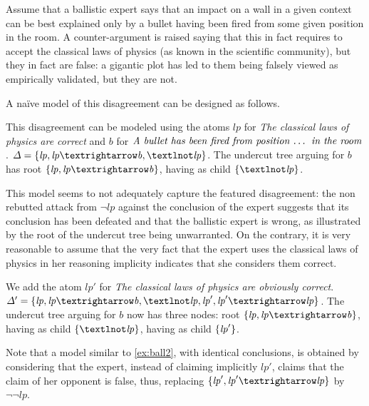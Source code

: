 \documentclass[version=3.21, pagesize, twoside=off, bibliography=totoc, DIV=calc, fontsize=12pt, a4paper, french, english]{scrartcl}
\begin{document}
\begin{example}
	\label{ex:ball}
	Assume that a ballistic expert says that an impact on a wall in a given context can be best explained only by a bullet having been fired from some given position in the room. A counter-argument is raised saying that this in fact requires to accept the classical laws of physics (as known in the scientific community), but they in fact are false: a gigantic plot has led to them being falsely viewed as empirically validated, but they are not.
\end{example}
A naïve model of this disagreement can be designed as follows.
\begin{example}
	\label{ex:ball1}
	This disagreement can be modeled using the atoms $\mathit{lp}$ for \emph{The classical laws of physics are correct} and $\mathit{b}$ for $\emph{A bullet has been fired from position … in the room}$.
	$\Delta = \set{\mathit{lp},\allowbreak \mathit{lp} → \mathit{b}, ¬\mathit{lp}}$.
	The undercut tree arguing for $\mathit{b}$ has root $\set{\mathit{lp},\allowbreak \mathit{lp} → \mathit{b}}$, having as child $\set{¬\mathit{lp}}$.
\end{example}
This model seems to not adequately capture the featured disagreement: the non rebutted attack from $¬\mathit{lp}$ against the conclusion of the expert suggests that its conclusion has been defeated and that the ballistic expert is wrong, as illustrated by the root of the undercut tree being unwarranted. On the contrary, it is very reasonable to assume that the very fact that the expert uses the classical laws of physics in her reasoning implicity indicates that she considers them correct. 
\begin{example}
	\label{ex:ball2}
	We add the atom $\mathit{lp}'$ for \emph{The classical laws of physics are obviously correct}.
	$\Delta' = \set{\mathit{lp},\allowbreak \mathit{lp} → \mathit{b}, ¬\mathit{lp}, \mathit{lp}', \mathit{lp}' → \mathit{lp}}$.
	The undercut tree arguing for $\mathit{b}$ now has three nodes: root $\set{\mathit{lp},\allowbreak \mathit{lp} → \mathit{b}}$, having as child $\set{¬\mathit{lp}}$, having as child $\{\mathit{lp}'\}$.
\end{example}

Note that a model similar to \cref{ex:ball2}, with identical conclusions, is obtained by considering that the expert, instead of claiming implicitly $\mathit{lp}'$, claims that the claim of her opponent is false, thus, replacing $\set{\mathit{lp}', \mathit{lp}' → \mathit{lp}}$ by $¬¬\mathit{lp}$.
\end{document}
